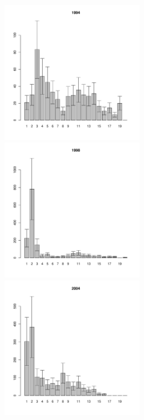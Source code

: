 \documentclass[12pt, a4paper]{article}
\begin{document}
\begin{figure}[h]
\begin{multicols}{3}
\hfill
\includegraphics[width=60mm]{../White_Sea/Luvenga_II_razrez/zostera_zone_1994_.pdf}
\hfill
\includegraphics[width=60mm]{../White_Sea/Luvenga_II_razrez/zostera_zone_1998_.pdf}
\hfill
\includegraphics[width=60mm]{../White_Sea/Luvenga_II_razrez/zostera_zone_2004_.pdf}
\end{multicols}



\end{figure}
\end{document}
